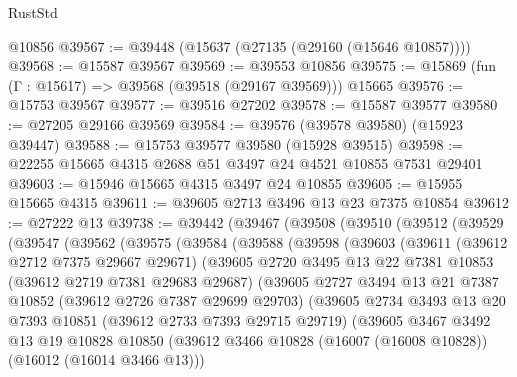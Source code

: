 \begin{lexlean}{RustStd}
\begin{coremodule}
    @10856
@39567 := @39448 (@15637 (@27135 (@29160 (@15646 @10857))))
@39568 := @15587 @39567
@39569 := @39553 @10856
@39575 := @15869 (fun (Γ : @15617) => @39568 (@39518 (@29167 @39569))) @15665
@39576 := @15753 @39567
@39577 := @39516 @27202
@39578 := @15587 @39577
@39580 := @27205 @29166 @39569
@39584 := @39576 (@39578 @39580) (@15923 @39447)
@39588 := @15753 @39577 @39580 (@15928 @39515)
@39598 := @22255 @15665 @4315 @2688 @51 @3497 @24 @4521 @10855 @7531 @29401
@39603 := @15946 @15665 @4315 @3497 @24 @10855
@39605 := @15955 @15665 @4315
@39611 := @39605 @2713 @3496 @13 @23 @7375 @10854
@39612 := @27222 @13
@39738 := @39442
    (@39467
      (@39508
        (@39510
          (@39512
            (@39529
              (@39547
                (@39562
                  (@39575
                    (@39584
                      (@39588
                        (@39598
                          (@39603
                            (@39611
                              (@39612 @2712 @7375 @29667 @29671)
                              (@39605
                                @2720
                                @3495
                                @13
                                @22
                                @7381
                                @10853
                                (@39612 @2719 @7381 @29683 @29687)
                                (@39605
                                  @2727
                                  @3494
                                  @13
                                  @21
                                  @7387
                                  @10852
                                  (@39612 @2726 @7387 @29699 @29703)
                                  (@39605
                                    @2734
                                    @3493
                                    @13
                                    @20
                                    @7393
                                    @10851
                                    (@39612 @2733 @7393 @29715 @29719)
                                    (@39605
                                      @3467
                                      @3492
                                      @13
                                      @19
                                      @10828
                                      @10850
                                      (@39612
                                        @3466
                                        @10828
                                        (@16007 (@16008 @10828))
                                        (@16012 (@16014 @3466 @13)))

\end{coremodule}
\end{lexlean}
